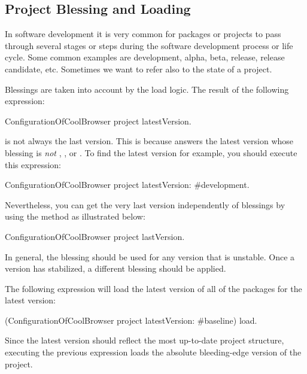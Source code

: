 \documentclass[a4paper,10pt,twoside]{book}
\begin{document}
    
\subsection{Project Blessing and Loading}

In software development it is very common for packages or projects to pass through several stages or steps during the software development process or life cycle. Some common examples are development, alpha, beta,  release, release candidate, etc. Sometimes we want to refer also to the state of a project.

Blessings are taken into account by the load logic. The result of the following expression:
\begin{code}{}
ConfigurationOfCoolBrowser project latestVersion.
\end{code}
is not always the last version.  This is because  answers the latest version whose blessing is {\em not} , , or . To find the latest  version for example, you should execute this expression:

\begin{code}{}
ConfigurationOfCoolBrowser project latestVersion: #development.
\end{code}

Nevertheless, you can get the very last version independently of blessings by using the  method as illustrated below:

\begin{code}{}
ConfigurationOfCoolBrowser project lastVersion.
\end{code}

In general, the  blessing should be used for any version that is unstable. Once a version has stabilized, a different blessing should be applied.

The following expression will load the latest version of all of the packages for the latest  version:
 \begin{code}{}
(ConfigurationOfCoolBrowser project latestVersion: #baseline) load.
\end{code}

Since the latest  version should reflect the most up-to-date project structure, executing the previous expression loads the absolute bleeding-edge version of the project. 
\end{document}
